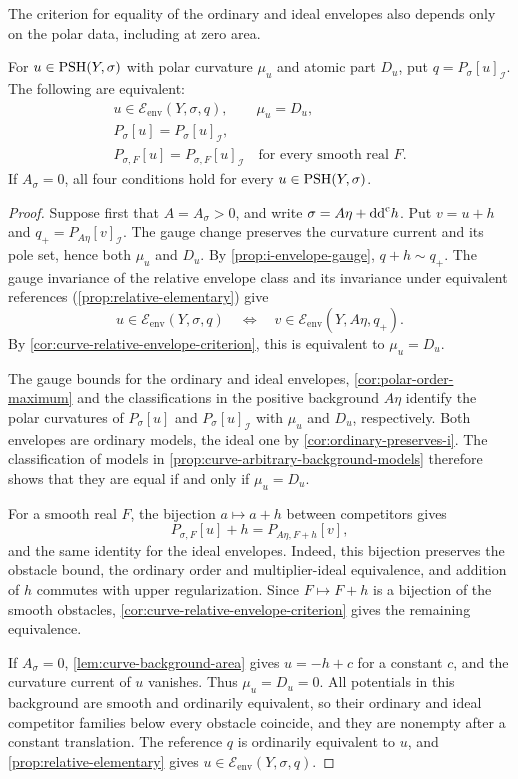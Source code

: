 The criterion for equality of the ordinary and ideal envelopes also depends only on the polar data, including at zero area.

\begin{corollary}\label{cor:curve-arbitrary-background-criterion}
For $u\in\mathrm{PSH}(Y,\sigma)$ with polar curvature $\mu_u$ and atomic part $D_u$, put $q=P_\sigma[u]_{\mathcal I}$. The following are equivalent:
\[
 \begin{gathered}
 u\in\mathcal E_{\mathrm{env}}(Y,\sigma,q),\qquad \mu_u=D_u,\\
 P_\sigma[u]=P_\sigma[u]_{\mathcal I},\\
 P_{\sigma,F}[u]=P_{\sigma,F}[u]_{\mathcal I}
       \quad\text{for every smooth real }F.
 \end{gathered}
\]
If $A_\sigma=0$, all four conditions hold for every $u\in\mathrm{PSH}(Y,\sigma)$.
\end{corollary}
\begin{proof}
Suppose first that $A=A_\sigma>0$, and write $\sigma=A\eta+\mathrm{dd}^{\mathrm{c}} h$. Put $v=u+h$ and $q_+=P_{A\eta}[v]_{\mathcal I}$. The gauge change preserves the curvature current and its pole set, hence both $\mu_u$ and $D_u$. By \cref{prop:i-envelope-gauge}, $q+h\sim q_+$. The gauge invariance of the relative envelope class and its invariance under equivalent references (\cref{prop:relative-elementary}) give
\[
 u\in\mathcal E_{\mathrm{env}}(Y,\sigma,q)
 \quad\Longleftrightarrow\quad
 v\in\mathcal E_{\mathrm{env}}(Y,A\eta,q_+).
\]
By \cref{cor:curve-relative-envelope-criterion}, this is equivalent to $\mu_u=D_u$.

The gauge bounds for the ordinary and ideal envelopes, \cref{cor:polar-order-maximum} and the classifications in the positive background $A\eta$ identify the polar curvatures of $P_\sigma[u]$ and $P_\sigma[u]_{\mathcal I}$ with $\mu_u$ and $D_u$, respectively. Both envelopes are ordinary models, the ideal one by \cref{cor:ordinary-preserves-i}. The classification of models in \cref{prop:curve-arbitrary-background-models} therefore shows that they are equal if and only if $\mu_u=D_u$.

For a smooth real $F$, the bijection $a\mapsto a+h$ between competitors gives
\[
 P_{\sigma,F}[u]+h=P_{A\eta,F+h}[v],
\]
and the same identity for the ideal envelopes. Indeed, this bijection preserves the obstacle bound, the ordinary order and multiplier-ideal equivalence, and addition of $h$ commutes with upper regularization. Since $F\mapsto F+h$ is a bijection of the smooth obstacles, \cref{cor:curve-relative-envelope-criterion} gives the remaining equivalence.

If $A_\sigma=0$, \cref{lem:curve-background-area} gives $u=-h+c$ for a constant $c$, and the curvature current of $u$ vanishes. Thus $\mu_u=D_u=0$. All potentials in this background are smooth and ordinarily equivalent, so their ordinary and ideal competitor families below every obstacle coincide, and they are nonempty after a constant translation. The reference $q$ is ordinarily equivalent to $u$, and \cref{prop:relative-elementary} gives $u\in\mathcal E_{\mathrm{env}}(Y,\sigma,q)$.
\end{proof}

